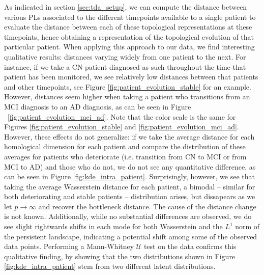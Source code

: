 \documentclass{article}
\begin{document}
As indicated in section \ref{sec:tda_setup}, we can compute the distance between various PLs associated to the different timepoints available to a single patient to evaluate the distance between each of these topological representations at these timepoints, hence obtaining a representation of the topological evolution of that particular patient. When applying this approach to our data, we find interesting qualitative results: distances varying widely from one patient to the next. For instance, if we take a CN patient diagnosed as such throughout the time that patient has been monitored, we see relatively low distances between that patients and other timepoints, see Figure \ref{fig:patient_evolution_stable} for an example. However, distances seem higher when taking a patient who transitions from an MCI diagnosis to an AD diagnosis, as can be seen in Figure ~\ref{fig:patient_evolution_mci_ad}. Note that the color scale is the same for Figures \ref{fig:patient_evolution_stable} and \ref{fig:patient_evolution_mci_ad}. However, these effects do not generalize: if we take the average distance for each homological dimension for each patient and compare the distribution of these averages for patients who deteriorate (i.e. transition from CN to MCI or from MCI to AD) and those who do not, we do not see any quantitative difference, as can be seen in Figure \ref{fig:kde_intra_patient}. Surprisingly, however, we see that taking the average Wasserstein distance for each patient, a bimodal -- similar for both deteriorating and stable patients -- distribution arises, but dissapears as we let $p\to\infty$ and recover the bottleneck distance. The cause of the distance change is not known. Additionally, while no substantial differences are observed, we do see slight rightwards shifts in each mode for both Wasserstein and the $L^1$ norm of the persistent landscape, indicating a potential shift among some of the observed data points. Performing a Mann-Whitney $\mathcal{U}$ test on the data confirms this qualitative finding, by showing that the two distributions shown in Figure \ref{fig:kde_intra_patient} stem from two different latent distributions.
\end{document}
